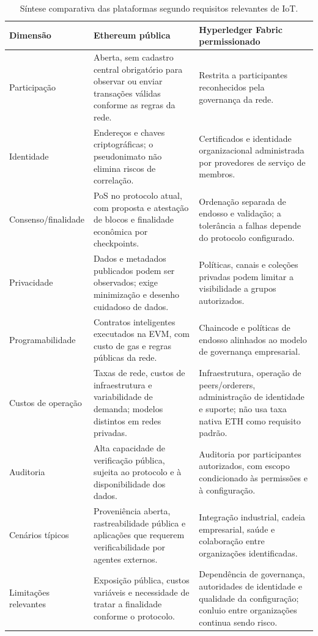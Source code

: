 \documentclass[10pt,a4paper,twocolumn]{article}
\begin{document}
\begin{table}[t]
\centering\small
\caption{Síntese comparativa das plataformas segundo requisitos relevantes de IoT.}
\label{tab:comparacao}
\begin{tabularx}{\textwidth}{p{}XX}
\toprule
Dimensão & Ethereum pública & Hyperledger Fabric permissionado \\
\midrule
Participação & Aberta, sem cadastro central obrigatório para observar ou enviar transações válidas conforme as regras da rede. & Restrita a participantes reconhecidos pela governança da rede. \\
Identidade & Endereços e chaves criptográficas; o pseudonimato não elimina riscos de correlação. & Certificados e identidade organizacional administrada por provedores de serviço de membros. \\
Consenso/finalidade & PoS no protocolo atual, com proposta e atestação de blocos e finalidade econômica por checkpoints. & Ordenação separada de endosso e validação; a tolerância a falhas depende do protocolo configurado. \\
Privacidade & Dados e metadados publicados podem ser observados; exige minimização e desenho cuidadoso de dados. & Políticas, canais e coleções privadas podem limitar a visibilidade a grupos autorizados. \\
Programabilidade & Contratos inteligentes executados na EVM, com custo de gas e regras públicas da rede. & Chaincode e políticas de endosso alinhados ao modelo de governança empresarial. \\
Custos de operação & Taxas de rede, custos de infraestrutura e variabilidade de demanda; modelos distintos em redes privadas. & Infraestrutura, operação de peers/orderers, administração de identidade e suporte; não usa taxa nativa ETH como requisito padrão. \\
Auditoria & Alta capacidade de verificação pública, sujeita ao protocolo e à disponibilidade dos dados. & Auditoria por participantes autorizados, com escopo condicionado às permissões e à configuração. \\
Cenários típicos & Proveniência aberta, rastreabilidade pública e aplicações que requerem verificabilidade por agentes externos. & Integração industrial, cadeia empresarial, saúde e colaboração entre organizações identificadas. \\
Limitações relevantes & Exposição pública, custos variáveis e necessidade de tratar a finalidade conforme o protocolo. & Dependência de governança, autoridades de identidade e qualidade da configuração; conluio entre organizações continua sendo risco. \\
\bottomrule
\end{tabularx}
\end{table}
\end{document}

